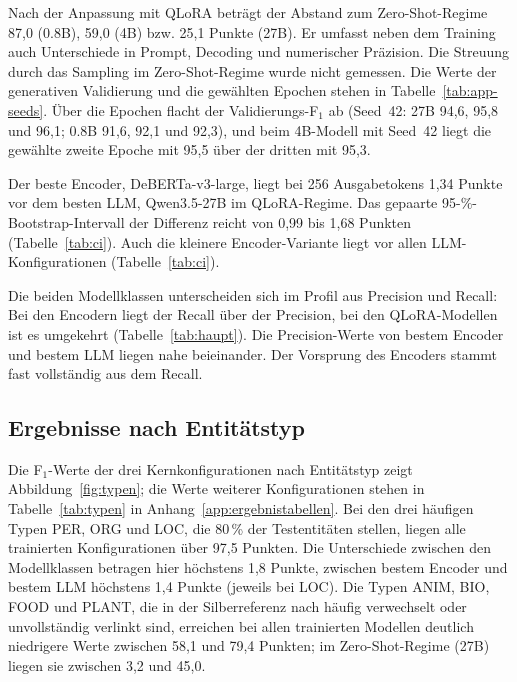 Nach der Anpassung mit QLoRA beträgt der Abstand zum Zero-Shot-Regime
87,0 (0.8B), 59,0 (4B) bzw. 25,1 Punkte (27B). Er umfasst neben dem
Training auch Unterschiede in Prompt, Decoding und numerischer Präzision.
Die Streuung durch das Sampling im Zero-Shot-Regime wurde nicht gemessen.
Die Werte der generativen Validierung und die gewählten Epochen stehen
in Tabelle~\ref{tab:app-seeds}. Über die Epochen flacht der
Validierungs-F$_1$ ab (Seed~42: 27B 94,6, 95,8 und 96,1; 0.8B 91,6, 92,1
und 92,3), und beim 4B-Modell mit Seed~42 liegt die gewählte zweite
Epoche mit 95,5 über der dritten mit 95,3.

Der beste Encoder, DeBERTa-v3-large, liegt bei 256 Ausgabetokens
1,34 Punkte vor dem besten LLM, Qwen3.5-27B im QLoRA-Regime. Das
gepaarte 95-\%-Bootstrap-Intervall der Differenz reicht von 0,99 bis
1,68 Punkten (Tabelle~\ref{tab:ci}).
Auch die kleinere Encoder-Variante liegt vor allen LLM-Konfigurationen
(Tabelle~\ref{tab:ci}).

Die beiden Modellklassen unterscheiden sich im Profil aus Precision und
Recall: Bei den Encodern liegt der Recall über der Precision, bei den
QLoRA-Modellen ist es umgekehrt (Tabelle~\ref{tab:haupt}).
Die Precision-Werte von bestem Encoder und bestem LLM liegen nahe
beieinander. Der Vorsprung des Encoders stammt fast vollständig aus dem
Recall.

\subsection{Ergebnisse nach Entitätstyp}
\label{sec:erg-typen}

Die F$_1$-Werte der drei Kernkonfigurationen nach Entitätstyp zeigt
Abbildung~\ref{fig:typen}; die Werte weiterer
Konfigurationen stehen in Tabelle~\ref{tab:typen} in
Anhang~\ref{app:ergebnistabellen}.
Bei den drei häufigen Typen PER, ORG und LOC, die 80\,\% der
Testentitäten stellen, liegen alle trainierten Konfigurationen über
97,5 Punkten. Die Unterschiede zwischen den Modellklassen betragen hier
höchstens 1,8 Punkte, zwischen bestem Encoder und bestem LLM höchstens
1,4 Punkte (jeweils bei LOC).
Die Typen ANIM, BIO, FOOD und PLANT, die in der Silberreferenz nach
\textcite{tedeschi2022multinerd} häufig verwechselt oder unvollständig
verlinkt sind, erreichen bei allen trainierten Modellen deutlich
niedrigere Werte zwischen 58,1 und 79,4 Punkten; im Zero-Shot-Regime
(27B) liegen sie zwischen 3,2 und 45,0.

